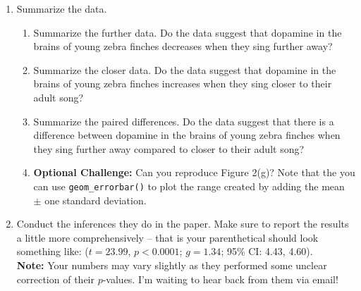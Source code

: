 \documentclass{article}\usepackage[]{graphicx}\usepackage[]{xcolor}
\makeatletter
\newcommand{\hlnum}[1]{\textcolor[rgb]{0.686,0.059,0.569}{#1}}%
\newcommand{\hlcom}[1]{\textcolor[rgb]{0.678,0.584,0.686}{\textit{#1}}}%
\newcommand{\hlopt}[1]{\textcolor[rgb]{0,0,0}{#1}}%
\newcommand{\hldef}[1]{\textcolor[rgb]{0.345,0.345,0.345}{#1}}%
\newcommand{\hlkwb}[1]{\textcolor[rgb]{0.69,0.353,0.396}{#1}}%
\newcommand{\hlkwc}[1]{\textcolor[rgb]{0.333,0.667,0.333}{#1}}%
\newcommand{\hlkwd}[1]{\textcolor[rgb]{0.737,0.353,0.396}{\textbf{#1}}}%
\newenvironment{kframe}{%
 \def\at@end@of@kframe{}%
 \ifinner\ifhmode%
  \def\at@end@of@kframe{\end{minipage}}%
  \begin{minipage}{\columnwidth}%
 \fi\fi%
 \def\FrameCommand##1{\hskip\@totalleftmargin \hskip-\fboxsep
 \colorbox{shadecolor}{##1}\hskip-\fboxsep
     \hskip-\linewidth \hskip-\@totalleftmargin \hskip\columnwidth}%
 \MakeFramed {\advance\hsize-\width
   \@totalleftmargin\z@ \linewidth\hsize
   \@setminipage}}%
 {\par\unskip\endMakeFramed%
 \at@end@of@kframe}
\newenvironment{knitrout}{}{} %
\makeatother
\begin{document}
\begin{enumerate}
\item Summarize the data.
\begin{enumerate}
  \item Summarize the further data. Do the data suggest that
   dopamine in the brains of young zebra finches decreases when
   they sing further away?
   \item Summarize the closer data. Do the data suggest that
   dopamine in the brains of young zebra finches increases when
   they sing closer to their adult song?
  \item Summarize the paired differences. Do the data suggest
  that there is a difference between dopamine in the brains of
  young zebra finches when they sing further away compared to 
  closer to their adult song?
  \item \textbf{Optional Challenge:} Can you reproduce Figure 2(g)?
  Note that the you can use \texttt{geom\_errorbar()} to plot
  the range created by adding the mean $\pm$ one standard deviation.
\end{enumerate}
\item Conduct the inferences they do in the paper. Make sure to report the results
a little more comprehensively -- that is your parenthetical should look something
like: ($t=23.99$, $p<0.0001$; $g=1.34$; 95\% CI: 4.43, 4.60).\\
\textbf{Note:} Your numbers may vary slightly as they performed some unclear
correction of their $p$-values. I'm waiting to hear back from them via email!
\end{enumerate}
\end{document}
